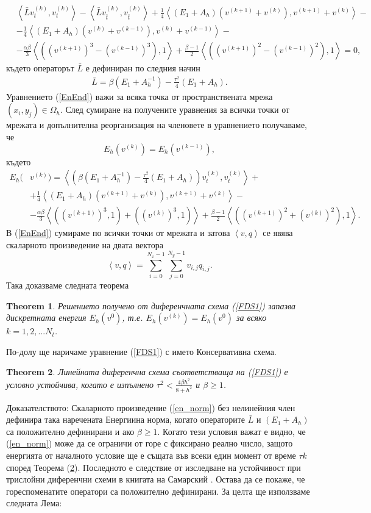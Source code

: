 \documentclass[a4paper]{article}
\newcommand{\be}{\begin{equation}}
\newcommand{\ee}{\end{equation}}
\newcommand{\rf}[1]{(\ref{#1})}
\newtheorem{thm}{Theorem}
\theoremstyle{remark}
\begin{document}
\begin{align}\label{EnEnd}
&\left< \bar L  v_{t}^{(k)}, v_{t}^{(k)} \right> - \left< \bar L v_{\bar t}^{(k)}, v_{\bar t}^{(k)} \right>  
 +\frac{1}{4} \left<  (E_1 +A_h ) \left( v^{(k+1)} + v^{(k)} \right ) , v^{(k+1)} + v^{(k)} \right>  -\nonumber \\
&- \frac{1}{4} \left<  (E_1 +A_h ) \left( v^{(k)} + v^{(k-1)} \right ) , v^{(k)} + v^{(k-1)} \right> - \nonumber \\
&- \frac{\alpha \beta}{3} \left< \left( (v^{(k+1)})^3-(v^{(k-1)})^3 \right), 1 \right> + \frac{\beta - 1}{2} \left< \left( (v^{(k+1)})^2-(v^{(k-1)})^2 \right), 1 \right> =0,
\end{align}
където операторът $\bar L$ е дефиниран по следния начин
\begin{align}
\bar L = \beta (E_1+A_h^{-1})- \frac{\tau^2}{4}( E_1+A_h ).
\end{align}
Уравнението \rf{EnEnd} важи за всяка точка от пространствената мрежа $(x_i,y_j) \in \Omega_h$. След сумиране на получените уравнения за всички точки от мрежата и допълнителна реорганизация на членовете в уравнението получаваме, че
\be \label{num_en}
E_h(v^{(k)}) =E_h(v^{(k-1)}),
\ee
където
\begin{align}\label{en_norm}
E_h(&v^{(k)})=\left< \left( \beta (E_1+A_h^{-1})- \frac{\tau^2}{4}( E_1+A_h ) \right)v_{t}^{(k)} ,v_{t}^{(k)} \right>+ \nonumber\\
&+\frac{1}{4}  \left<  ( E_1+A_h)(v^{(k+1)}+v^{(k)}), v^{(k+1)}+v^{(k)} \right> - \nonumber\\
&- \frac{\alpha \beta}{3} \left< ((v^{(k+1)})^3,1)+((v^{(k)})^3,1) \right> + \frac{\beta - 1}{2} \left< \left( (v^{(k+1)})^2+(v^{(k)})^2 \right), 1 \right>.
\end{align}
В \rf{EnEnd} сумираме по всички точки от мрежата и затова  $\left< v, q \right>$ се явява скаларното произведение на двата вектора 
\be\label{dotProd}
\left<v, q \right> = \sum_{i=0}^{N_x-1} \sum_{j=0}^{N_y-1} v_{i,j} q_{i,j}.
\ee
Така доказваме следната теорема
\begin{thm}\label{th0}
Решението получено от диференчната схема \rf{FDS1} запазва дискретната енергия $E_h(v^0)$, т.е.  $E_h(v^{(k)}) =E_h(v^{0})$ за всяко $k=1,2,...N_t$.
\end{thm}
По-долу ще наричаме уравнение \rf{FDS1} с името Консервативна схема.
\begin{thm}\label{th1}
Линейната диференчна схема съответстваща на \rf{FDS1} е условно устойчива, когато е изпълнено
$\tau^2 < \frac{4 \beta h^2}{8 + h^2}$ и $\beta \ge 1$.
\end{thm}
Доказателството:
Скаларното произведение \rf{en_norm} без нелинейния член дефинира така наречената Енергиина норма, когато операторите $\bar{L}$ и $(E_1 + A_h)$ са положително дефинирани и ако $\beta \ge 1$. Когато тези условия важат е видно, че \rf{en_norm} може да се ограничи от горе с фиксирано реално число, защото енергията от началното условие ще е същата във всеки един момент от време $\tau k$ според Теорема \rf{th1}. Последното е следствие от изследване на устойчивост при трислойни диференчни схеми в книгата на Самарский \cite{samarski}. Остава да се покаже, че гореспоменатите оператори са положително дефинирани. За целта ще използваме следната Лема:
\end{document}
